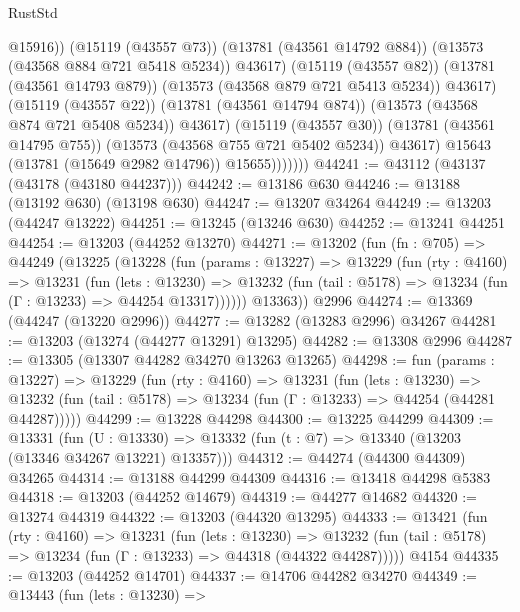 \begin{lexlean}{RustStd}
\begin{coremodule}
                              @15916))
                          (@15119 (@43557 @73))
                          (@13781 (@43561 @14792 @884))
                          (@13573 (@43568 @884 @721 @5418 @5234))
                          @43617)
                        (@15119 (@43557 @82))
                        (@13781 (@43561 @14793 @879))
                        (@13573 (@43568 @879 @721 @5413 @5234))
                        @43617)
                      (@15119 (@43557 @22))
                      (@13781 (@43561 @14794 @874))
                      (@13573 (@43568 @874 @721 @5408 @5234))
                      @43617)
                    (@15119 (@43557 @30))
                    (@13781 (@43561 @14795 @755))
                    (@13573 (@43568 @755 @721 @5402 @5234))
                    @43617)
                  @15643
                  (@13781 (@15649 @2982 @14796))
                  @15655)))))))
@44241 := @43112 (@43137 (@43178 (@43180 @44237)))
@44242 := @13186 @630
@44246 := @13188 (@13192 @630) (@13198 @630)
@44247 := @13207 @34264
@44249 := @13203 (@44247 @13222)
@44251 := @13245 (@13246 @630)
@44252 := @13241 @44251
@44254 := @13203 (@44252 @13270)
@44271 := @13202
    (fun (fn : @705) =>
    @44249
      (@13225
        (@13228
          (fun (params : @13227) =>
          @13229
            (fun (rty : @4160) =>
            @13231
              (fun (lets : @13230) =>
              @13232 (fun (tail : @5178) => @13234 (fun (Γ : @13233) => @44254 @13317))))))
        @13363))
    @2996
@44274 := @13369 (@44247 (@13220 @2996))
@44277 := @13282 (@13283 @2996) @34267
@44281 := @13203 (@13274 (@44277 @13291) @13295)
@44282 := @13308 @2996
@44287 := @13305 (@13307 @44282 @34270 @13263 @13265)
@44298 := fun (params : @13227) =>
  @13229
    (fun (rty : @4160) =>
    @13231
      (fun (lets : @13230) =>
      @13232 (fun (tail : @5178) => @13234 (fun (Γ : @13233) => @44254 (@44281 @44287)))))
@44299 := @13228 @44298
@44300 := @13225 @44299
@44309 := @13331
    (fun (U : @13330) => @13332 (fun (t : @7) => @13340 (@13203 (@13346 @34267 @13221) @13357)))
@44312 := @44274 (@44300 @44309) @34265
@44314 := @13188 @44299 @44309
@44316 := @13418 @44298 @5383
@44318 := @13203 (@44252 @14679)
@44319 := @44277 @14682
@44320 := @13274 @44319
@44322 := @13203 (@44320 @13295)
@44333 := @13421
    (fun (rty : @4160) =>
    @13231
      (fun (lets : @13230) =>
      @13232 (fun (tail : @5178) => @13234 (fun (Γ : @13233) => @44318 (@44322 @44287)))))
    @4154
@44335 := @13203 (@44252 @14701)
@44337 := @14706 @44282 @34270
@44349 := @13443
    (fun (lets : @13230) =>

\end{coremodule}
\end{lexlean}
